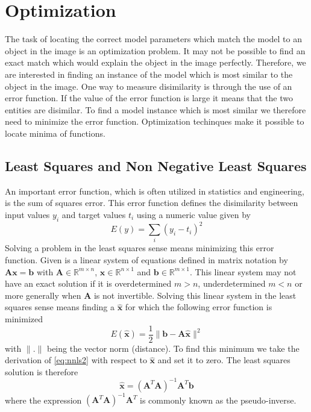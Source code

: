 \documentclass[11pt,a4paper]{report}
\begin{document}
\section{Optimization}
The task of locating the correct model parameters which match the model to an
object in the image is an optimization problem. It may not be possible to find
an exact match which would explain the object in the image perfectly. Therefore,
we are interested in finding an instance of the model which is most similar to the
object in the image. One way to measure disimilarity is through the use of an error function. If the
value of the error function is large it means that the two entities are
disimilar. To find a model instance which is most similar we therefore need to
minimize the error function. Optimization techinques make it possible to locate
minima of functions.

\subsection{Least Squares and Non Negative Least Squares}
An important error function, which is often utilized in statistics and engineering, is the
sum of squares error. This error function defines the disimilarity between input
values $y_i$ and target values $t_i$ using a numeric value given by
\begin{equation}\label{eq:nnls}
E(y) = \sum_i (y_i - t_i)^2
\end{equation}
Solving a problem in the least squares sense means minimizing this error
function. Given is a linear system of equations defined in matrix notation by
$\mathbf{A}\mathbf{x} = \mathbf{b}$ with $\mathbf{A} \in \mathbb{R}^{m\times
  n}$, $\mathbf{x} \in \mathbb{R}^{n\times 1}$ and $\mathbf{b} \in
\mathbb{R}^{m\times 1}$. This linear system may not have an exact solution if it
is overdetermined $m > n$, underdetermined $m < n$  or more generally when
$\mathbf{A}$ is not invertible. Solving this linear system in the least squares sense
means finding a $\mathbf{\hat{x}}$ for which the following error function is
minimized
\begin{equation}\label{eq:nnls2}
E(\mathbf{\hat{x}}) = \frac{1}{2}\lVert \mathbf{b} - \mathbf{A\hat{x}} \rVert^2
\end{equation}
with $\lVert . \rVert$ being the vector norm (distance).
To find this minimum we take the derivation of \ref{eq:nnls2} with respect to
$\mathbf{\hat{x}}$ and set it to zero. The least squares solution is therefore
\begin{equation}\label{eq:nnls2}
\mathbf{\hat{x}} = (\mathbf{A}^T\mathbf{A})^{-1}\mathbf{A}^T\mathbf{b}
\end{equation}
where the expression $(\mathbf{A}^T\mathbf{A})^{-1}\mathbf{A}^T$ is commonly
known as the pseudo-inverse.
\end{document}
